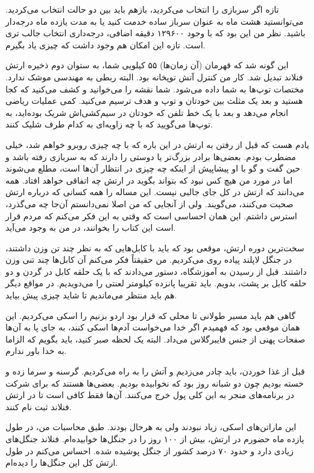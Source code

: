 تازه اگر سربازی را انتخاب می‌کردید، بازهم باید بین دو حالت انتخاب
می‌کردید. می‌توانستید هشت ماه به عنوان سرباز ساده خدمت کنید یا به مدت
یازده ماه درجه‌دار باشید. نظر من این بود که با وجود ۱۲۹۶۰۰ دقیقه اضافی،
درجه‌داری انتخاب جالب تری است. تازه این امکان هم وجود داشت که چیزی یاد
بگیرم.

این گونه شد که قهرمان (آن زمان‌ها) ۵۵ کیلویی شما، به ستوان دوم ذخیره
ارتش فنلاند تبدیل شد. کار من کنترل آتش توپخانه بود. البته ربطی به
مهندسی موشک ندارد. مختصات توپ‌ها به شما داده می‌شود. شما نقشه را
می‌خوانید و کشف می‌کنید که کجا هستید و بعد یک مثلث بین خودتان و توپ و
هدف ترسیم می‌کنید. کمی عملیات ریاضی انجام می‌دهد و بعد با یک خط تلفن که
خودتان در سیم‌کشی‌اش شریک بوده‌اید، به توپ‌ها می‌گویید که با چه زاویه‌ای به
کدام طرف شلیک کنند.

یادم هست که قبل از رفتن به ارتش در این باره که با چه چیزی روبرو خواهم
شد، خیلی مضطرب بودم. بعضی‌ها برادر بزرگ‌تر یا دوستی را دارند که به
سربازی رفته باشد و حین گفت و گو با او پیشاپیش از اینکه چه چیزی در
انتظار آن‌ها است، مطلع می‌شوند اما در مورد من هیچ کس نبود که بتواند
بگوید در ارتش چه اتفاقی خواهد افتاد. همه می‌دانند که ارتش در کل جای
جالبی نیست. این مساله را همه کسانی که درباره ارتش صحبت می‌کنند،
می‌گویند. ولی از آنجایی که من اصلا نمی‌دانستم آن‌جا چه می‌گذرد، استرس
داشتم. این همان احساسی است که وقتی به این فکر می‌کنم که مردم قرار است
این کتاب را بخوانند، در من به وجود می‌آید.

سخت‌ترین دوره ارتش، موقعی بود که باید با کابل‌هایی که به نظر چند تن وزن
داشتند، در جنگل لاپلند پیاده روی
می‌کردیم. من حقیقتاً فکر می‌کنم آن کابل‌ها چند تنی وزن داشتند. قبل از
رسیدن به آموزشگاه، دستور می‌دادند که با یک حلقه کابل در گردن و دو حلقه
کابل بر پشت، بدویم. باید تقریبا پانزده کیلومتر لعنتی را می‌دویدیم. در
مواقع دیگر هم باید منتظر می‌ماندیم تا شاید چیزی پیش بیاید.

گاهی هم باید مسیر طولانی تا محلی که قرار بود اردو بزنیم را اسکی
می‌کردیم. این همان موقعی بود که فهمیدم اگر خدا می‌خواست آدم‌ها اسکی کنند،
به جای پا به آن‌ها صفحات پهنی از جنس فایبرگلاس می‌داد. البته یک لحظه صبر
کنید، باید بگویم که الزاما به خدا باور ندارم.

قبل از غذا خوردن، باید چادر می‌زدیم و آتش را به راه می‌کردیم. گرسنه و
سرما زده و خسته بودیم چون دو شبانه روز بود که نخوابیده بودیم. بعضی‌ها
هستند که برای شرکت در برنامه‌های منجر به این  کلی پول خرج می‌کنند. آن‌ها فقط کافی است تا در ارتش فنلاند ثبت نام
کنند.

این ماراتن‌های اسکی، زیاد نبودند ولی به هرحال بودند. طبق محاسبات من،‌ در
طول یازده ماه حضورم در ارتش، بیش از ۱۰۰ روز را در جنگل‌ها
خوابیده‌ام. فنلاند جنگل‌های زیادی دارد و حدود ۷۰ درصد کشور از جنگل
پوشیده شده. احساس می‌کنم در طول ارتش کل این جنگل‌ها را دیده‌ام.

